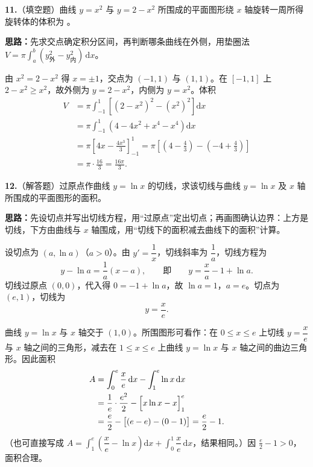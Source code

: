 \else \answerarea[8] \fi%

\textbf{11.}（填空题）曲线 $y=x^2$ 与 $y=2-x^2$ 所围成的平面图形绕 $x$ 轴旋转一周所得旋转体的体积为 \underline{\qquad}。

\ifshowsolutions%
\textbf{思路：}先求交点确定积分区间，再判断哪条曲线在外侧，用垫圈法 $V=\pi\int_a^b(y_{\text{外}}^2-y_{\text{内}}^2)\,\mathrm dx$。

由 $x^2=2-x^2$ 得 $x=\pm1$，交点为 $(-1,1)$ 与 $(1,1)$。在 $[-1,1]$ 上 $2-x^2\ge x^2$，故外侧为 $y=2-x^2$，内侧为 $y=x^2$。体积
\[
\begin{aligned}
  V&=\pi\int_{-1}^{1}\left[(2-x^2)^2-(x^2)^2\right]\mathrm dx\\
   &=\pi\int_{-1}^{1}\left(4-4x^2+x^4-x^4\right)\mathrm dx\\
   &=\pi\left[4x-\frac{4x^3}{3}\right]_{-1}^{1}
    =\pi\left[\left(4-\frac43\right)-\left(-4+\frac43\right)\right]\\
   &=\pi\cdot\frac{16}{3}=\frac{16\pi}{3}.
\end{aligned}
\]

\else \answerarea[8] \fi%

\textbf{12.}（解答题）过原点作曲线 $y=\ln x$ 的切线，求该切线与曲线 $y=\ln x$ 及 $x$ 轴所围成的平面图形的面积。

\ifshowsolutions%
\textbf{思路：}先设切点并写出切线方程，用“过原点”定出切点；再画图确认边界：上方是切线，下方由曲线与 $x$ 轴围成，用“切线下的面积减去曲线下的面积”计算。

设切点为 $(a,\ln a)$（$a>0$）。由 $y'=\dfrac1x$，切线斜率为 $\dfrac1a$，切线方程为
\[
  y-\ln a=\frac1a(x-a),\qquad\text{即}\qquad y=\frac{x}{a}-1+\ln a.
\]
切线过原点 $(0,0)$，代入得 $0=-1+\ln a$，故 $\ln a=1$，$a=e$。切点为 $(e,1)$，切线为
\[
  y=\frac{x}{e}.
\]

曲线 $y=\ln x$ 与 $x$ 轴交于 $(1,0)$。所围图形可看作：在 $0\le x\le e$ 上切线 $y=\dfrac{x}{e}$ 与 $x$ 轴之间的三角形，减去在 $1\le x\le e$ 上曲线 $y=\ln x$ 与 $x$ 轴之间的曲边三角形。因此面积
\[
\begin{aligned}
  A&=\int_0^e\frac{x}{e}\,\mathrm dx-\int_1^e\ln x\,\mathrm dx\\
   &=\frac{1}{e}\cdot\frac{e^2}{2}-\Bigl[x\ln x-x\Bigr]_1^e\\
   &=\frac e2-\bigl[(e-e)-(0-1)\bigr]
    =\frac e2-1.
\end{aligned}
\]
（也可直接写成 $A=\int_1^e\left(\dfrac{x}{e}-\ln x\right)\mathrm dx+\int_0^1\dfrac{x}{e}\,\mathrm dx$，结果相同。）因 $\frac e2-1>0$，面积合理。

\else \answerarea[10] \fi%
